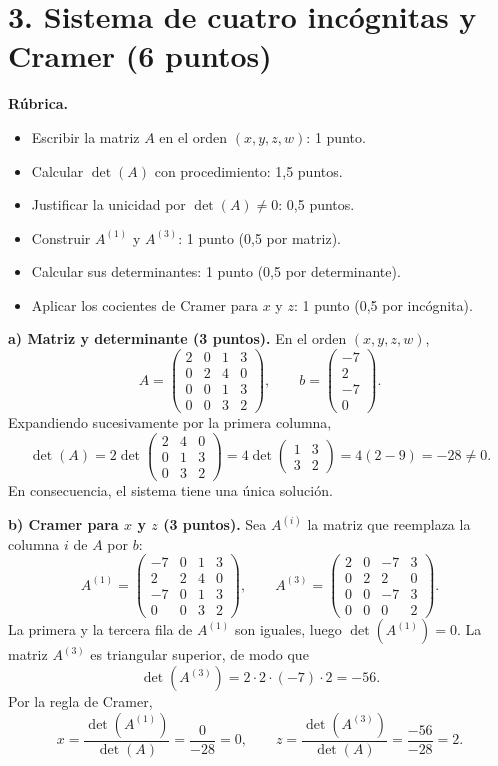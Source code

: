 \documentclass[10pt,a4]{examenEPN0}
\begin{document}
\section*{3. Sistema de cuatro incógnitas y Cramer (6 puntos)}
\noindent\textbf{Rúbrica.}
\begin{itemize}[itemsep=2pt]
    \item Escribir la matriz $A$ en el orden $(x,y,z,w)$: 1 punto.
    \item Calcular $\det(A)$ con procedimiento: 1,5 puntos.
    \item Justificar la unicidad por $\det(A)\ne0$: 0,5 puntos.
    \item Construir $A^{(1)}$ y $A^{(3)}$: 1 punto (0,5 por matriz).
    \item Calcular sus determinantes: 1 punto (0,5 por determinante).
    \item Aplicar los cocientes de Cramer para $x$ y $z$: 1 punto (0,5 por incógnita).
\end{itemize}
\noindent\textbf{a) Matriz y determinante (3 puntos).}
En el orden $(x,y,z,w)$,
\[
    A=\begin{pmatrix}2&0&1&3\\0&2&4&0\\0&0&1&3\\0&0&3&2\end{pmatrix},
    \qquad b=\begin{pmatrix}-7\\2\\-7\\0\end{pmatrix}.
\]
Expandiendo sucesivamente por la primera columna,
\[
    \det(A)=2\det\begin{pmatrix}2&4&0\\0&1&3\\0&3&2\end{pmatrix}
    =4\det\begin{pmatrix}1&3\\3&2\end{pmatrix}
    =4(2-9)=-28\ne0.
\]
En consecuencia, el sistema tiene una única solución.

\noindent\textbf{b) Cramer para $x$ y $z$ (3 puntos).}
Sea $A^{(i)}$ la matriz que reemplaza la columna $i$ de $A$ por $b$:
\[
    A^{(1)}=\begin{pmatrix}-7&0&1&3\\2&2&4&0\\-7&0&1&3\\0&0&3&2\end{pmatrix},
    \qquad
    A^{(3)}=\begin{pmatrix}2&0&-7&3\\0&2&2&0\\0&0&-7&3\\0&0&0&2\end{pmatrix}.
\]
La primera y la tercera fila de $A^{(1)}$ son iguales, luego
$\det(A^{(1)})=0$. La matriz $A^{(3)}$ es triangular superior, de modo que
\[
    \det(A^{(3)})=2\cdot2\cdot(-7)\cdot2=-56.
\]
Por la regla de Cramer,
\[
    \boxed{x=\frac{\det(A^{(1)})}{\det(A)}=\frac{0}{-28}=0,
    \qquad z=\frac{\det(A^{(3)})}{\det(A)}=\frac{-56}{-28}=2.}
\]
\end{document}
